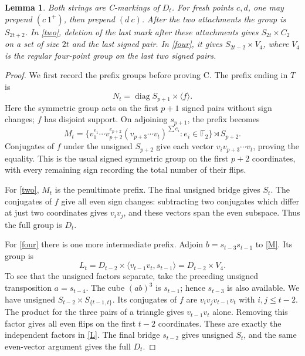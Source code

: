 \documentclass[11pt]{article}
\newcommand{\gen}[1]{\langle#1\rangle}
\newtheorem{lemma}[theorem]{Lemma}
\begin{document}
\begin{lemma}\label{caps}
Both strings are C-markings of $D_t$. For fresh points $c,d$, one
may prepend $(c\ 1^+)$, then prepend $(d\ c)$.
After the two attachments the group is
$S_{2t+2}$. In \eqref{two}, deletion of the last mark after these
attachments gives $S_{2t}\times C_2$ on a set of size $2t$ and the
last signed pair. In \eqref{four}, it gives
$S_{2t-2}\times V_4$, where $V_4$ is the regular four-point group
on the last two signed pairs.
\end{lemma}
\begin{proof}
We first record the prefix groups before proving C. The prefix ending
in $T$ is
\begin{equation}\label{N}
 N_t=\operatorname{diag}S_{p+1}\times\gen f.
\end{equation}
Here the symmetric group acts on the first $p+1$ signed pairs without
sign changes; $f$ has disjoint support. On adjoining $s_{p+1}$, the
prefix becomes
\begin{equation}\label{M}
 M_t=\{v_1^{e_1}\cdots v_{p+2}^{e_{p+2}}
       (v_{p+3}\cdots v_t)^{\sum e_i}:e_i\in\mathbb F_2\}
       \rtimes S_{p+2}.
\end{equation}
Conjugates of $f$ under the unsigned $S_{p+2}$ give each vector
$v_i v_{p+3}\cdots v_t$, proving the equality. This is the usual
signed symmetric group on the first $p+2$ coordinates, with every
remaining sign recording the total number of their flips.

For \eqref{two}, $M_t$ is the penultimate prefix. The final unsigned
bridge gives $S_t$. The conjugates of $f$ give all even sign changes:
subtracting two conjugates which differ at just two coordinates gives
$v_i v_j$, and these vectors span the even subspace. Thus the full
group is $D_t$.

For \eqref{four} there is one more intermediate prefix. Adjoin
$b=s_{t-3}s_{t-1}$ to \eqref{M}. Its group is
\begin{equation}\label{L}
 L_t=D_{t-2}\times
       \gen{v_{t-1}v_t,s_{t-1}}=D_{t-2}\times V_4.
\end{equation}
To see that the unsigned factors separate, take the preceding unsigned
transposition $a=s_{t-4}$. The cube $(ab)^3$ is $s_{t-1}$;
hence $s_{t-3}$ is also available. We have unsigned
$S_{t-2}\times S_{\{t-1,t\}}$. Its conjugates of $f$ are
$v_i v_j v_{t-1}v_t$ with $i,j\le t-2$. The product for the
three pairs of a triangle gives $v_{t-1}v_t$ alone. Removing this
factor gives all even flips on the first $t-2$ coordinates. These
are exactly the independent factors in \eqref{L}. The final bridge
$s_{t-2}$ gives unsigned $S_t$, and the same even-vector argument
gives the full $D_t$.


\end{proof}
\end{document}
